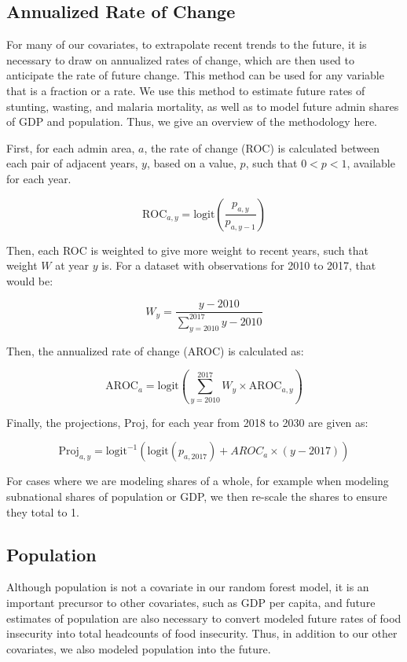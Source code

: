 \documentclass{article}
\begin{document}
\subsection{Annualized Rate of Change}
For many of our covariates, to extrapolate recent trends to the future, it is necessary to draw on annualized rates of change, which are then used to anticipate the rate of future change.  This method can be used for any variable that is a fraction or a rate.  We use this method to estimate future rates of stunting, wasting, and malaria mortality, as well as to model future admin shares of GDP and population.  Thus, we give an overview of the methodology here.

First, for each admin area, $a$, the rate of change (ROC) is calculated between each pair of adjacent years, $y$, based on a value, $p$, such that $0 < p < 1$, available for each year.

\begin{equation}
  \text{ROC}_{a,y} = \text{logit} \left( \frac{p_{a,y}}{p_{a,y-1}} \right)
  \label{eqn:a}
\end{equation}

Then, each ROC is weighted to give more weight to recent years, such that weight $W$ at year $y$ is.  For a dataset with observations for 2010 to 2017, that would be:

\begin{equation}
  W_y = \frac{y - 2010}{\sum_{y=2010}^{2017} y - 2010}
  \label{eqn:b}
\end{equation}

Then, the annualized rate of change (AROC) is calculated as:

\begin{equation}
  \text{AROC}_{a} = \text{logit} \left( \sum_{y=2010}^{2017} W_y \times \text{AROC}_{a, y} \right)
  \label{eqn:c}
\end{equation}

Finally, the projections, Proj, for each year from 2018 to 2030 are given as:

\begin{equation}
  \text{Proj}_{a,y} = \text{logit}^{-1} ( \text{logit} ( p_{a,2017} ) + AROC_{a} \times ( y - 2017 ) )
  \label{eqn:d}
\end{equation}

For cases where we are modeling shares of a whole, for example when modeling subnational shares of population or GDP, we then re-scale the shares to ensure they total to 1.

\subsection{Population}
Although population is not a covariate in our random forest model, it is an important precursor to other covariates, such as GDP per capita, and future estimates of population are also necessary to convert modeled future rates of food insecurity into total headcounts of food insecurity.  Thus, in addition to our other covariates, we also modeled population into the future.
\end{document}
